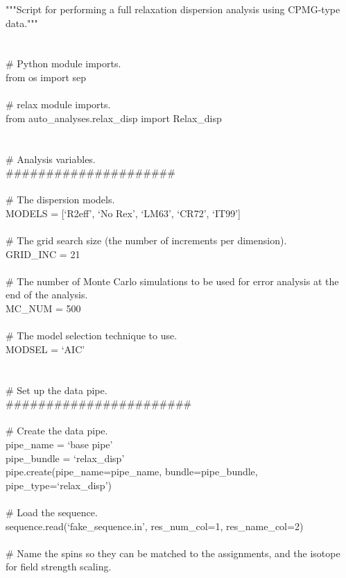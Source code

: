 \begin{exampleenv}
"""Script for performing a full relaxation dispersion analysis using CPMG-type data.""" \\
 \\
 \\
\# Python module imports. \\
from os import sep \\
 \\
\# relax module imports. \\
from auto\_analyses.relax\_disp import Relax\_disp \\
 \\
 \\
\# Analysis variables. \\
\#\#\#\#\#\#\#\#\#\#\#\#\#\#\#\#\#\#\#\#\# \\
 \\
\# The dispersion models. \\
MODELS = [`R2eff', `No Rex', `LM63', `CR72', `IT99'] \\
 \\
\# The grid search size (the number of increments per dimension). \\
GRID\_INC = 21 \\
 \\
\# The number of Monte Carlo simulations to be used for error analysis at the end of the analysis. \\
MC\_NUM = 500 \\
 \\
\# The model selection technique to use. \\
MODSEL = `AIC' \\
 \\
 \\
\# Set up the data pipe. \\
\#\#\#\#\#\#\#\#\#\#\#\#\#\#\#\#\#\#\#\#\#\#\# \\
 \\
\# Create the data pipe. \\
pipe\_name = `base pipe' \\
pipe\_bundle = `relax\_disp' \\
pipe.create(pipe\_name=pipe\_name, bundle=pipe\_bundle, pipe\_type=`relax\_disp') \\
 \\
\# Load the sequence. \\
sequence.read(`fake\_sequence.in', res\_num\_col=1, res\_name\_col=2) \\
 \\
\# Name the spins so they can be matched to the assignments, and the isotope for field strength scaling. \\

\end{exampleenv}
